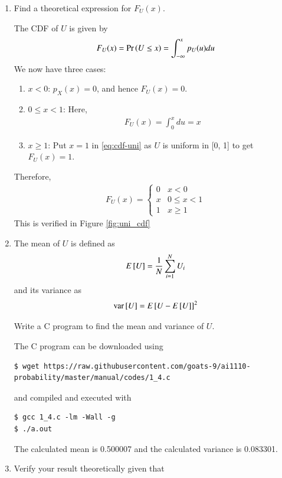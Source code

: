 \documentclass[journal,12pt,twocolumn]{IEEEtran}
\renewcommand\thesection{\arabic{section}}
\begin{document}
\begin{enumerate}[label=\thesection.\arabic*
,ref=\thesection.\theenumi]
%
\item
Find a theoretical expression for $F_{U}(x)$.

\solution
The CDF of $U$ is given by
		\begin{align}
			F_U(x) = \Pr\left(U \leq x\right) = \int_{-\infty}^{x}p_U(u)du
		\end{align}
We now have three cases:
		\begin{enumerate}
			\item $x < 0$: $p_X(x) = 0$, and hence $F_U(x) = 0$.
			\item $0 \leq x < 1$: Here,
				\begin{align}
					F_U(x) = \int_{0}^{x}du = x
					\label{eq:cdf-uni}
				\end{align}
			\item $x \geq 1$: Put $x = 1$ in \eqref{eq:cdf-uni} as $U$ is uniform in [0, 1] to get $F_U(x) = 1$.
		\end{enumerate}
Therefore,
		\begin{align}
			F_U(x) = 
			\begin{cases}
				0 & x < 0 \\
				x & 0 \leq x < 1 \\
				1 & x \geq 1
			\end{cases}
			\label{eq:cdf-ans}
		\end{align}
This is verified in Figure \eqref{fig:uni_cdf}
\item
The mean of $U$ is defined as
%
\begin{equation}
E{}\left[U\right] = \frac{1}{N}\sum_{i=1}^{N}U_i
	\label{eq:mean-form}
\end{equation}
%
and its variance as
%
\begin{equation}
\text{var}{}\left[U\right] = E{}\left[U- E{}\left[U\right]\right]^2 
	\label{eq:var-form}
\end{equation}

Write a C program to  find the mean and variance of $U$.

\solution
The C program can be downloaded using
\begin{lstlisting}
$ wget https://raw.githubusercontent.com/goats-9/ai1110-probability/master/manual/codes/1_4.c
\end{lstlisting}
and compiled and executed with
\begin{lstlisting}
$ gcc 1_4.c -lm -Wall -g
$ ./a.out
\end{lstlisting}
The calculated mean is 0.500007 and the calculated variance is 0.083301.

\item Verify your result theoretically given that
\end{enumerate}
\end{document}
